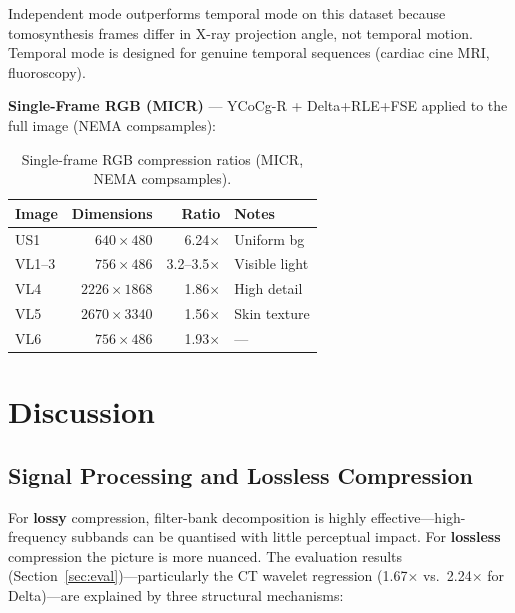 \documentclass[10pt,twocolumn]{article}
\begin{document}
Independent mode outperforms temporal mode on this dataset because
tomosynthesis frames differ in X-ray projection angle, not temporal motion.
Temporal mode is designed for genuine temporal sequences (cardiac cine MRI,
fluoroscopy).

\textbf{Single-Frame RGB (MICR)} --- YCoCg-R + Delta+RLE+FSE applied to the
full image (NEMA compsamples):

\begin{table}[htbp]
\centering
\footnotesize
\setlength{\tabcolsep}{4pt}
\caption{Single-frame RGB compression ratios (MICR, NEMA compsamples).}
\label{tab:rgb}
\begin{tabular}{lrrp{2.0cm}}
\toprule
Image & Dimensions & Ratio & Notes \\
\midrule
US1    & $640{\times}480$   & 6.24$\times$ & Uniform bg \\
VL1--3 & $756{\times}486$   & 3.2--3.5$\times$ & Visible light \\
VL4    & $2226{\times}1868$ & 1.86$\times$ & High detail \\
VL5    & $2670{\times}3340$ & 1.56$\times$ & Skin texture \\
VL6    & $756{\times}486$   & 1.93$\times$ & --- \\
\bottomrule
\end{tabular}
\end{table}

\section{Discussion}
\label{sec:discussion}

\subsection{Signal Processing and Lossless Compression}

For \textbf{lossy} compression, filter-bank decomposition is highly
effective---high-frequency subbands can be quantised with little perceptual
impact. For \textbf{lossless} compression the picture is more nuanced. The
evaluation results (Section~\ref{sec:eval})---particularly the CT wavelet
regression (1.67$\times$ vs.\ 2.24$\times$ for Delta)---are explained by three
structural mechanisms:
\end{document}
